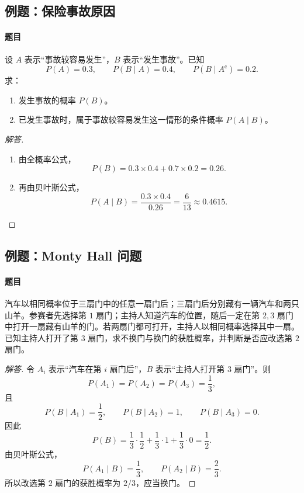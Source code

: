 \subsection{例题：保险事故原因}\label{note:c1:e19}
\paragraph{题目}
设 $A$ 表示“事故较容易发生”，$B$ 表示“发生事故”。已知
\[
P(A)=0.3,
\qquad
P(B\mid A)=0.4,
\qquad
P(B\mid A^{\mathrm c})=0.2.
\]
求：
\begin{enumerate}
\item 发生事故的概率 $P(B)$。
\item 已发生事故时，属于事故较容易发生这一情形的条件概率 $P(A\mid B)$。
\end{enumerate}

\begin{proof}[解答]
\begin{enumerate}
\item 由全概率公式，
\[
P(B)=0.3\times0.4+0.7\times0.2=0.26.
\]
\item 再由贝叶斯公式，
\[
P(A\mid B)
=\frac{0.3\times0.4}{0.26}
=\frac6{13}
\approx0.4615.
\]
\end{enumerate}
\end{proof}

\subsection{例题：Monty Hall 问题}\label{note:c1:e20}
\paragraph{题目}
汽车以相同概率位于三扇门中的任意一扇门后；三扇门后分别藏有一辆汽车和两只山羊。参赛者先选择第 $1$ 扇门；主持人知道汽车的位置，随后一定在第 $2,3$ 扇门中打开一扇藏有山羊的门。若两扇门都可打开，主持人以相同概率选择其中一扇。已知主持人打开了第 $3$ 扇门，求不换门与换门的获胜概率，并判断是否应改选第 $2$ 扇门。

\begin{proof}[解答]
令 $A_i$ 表示“汽车在第 $i$ 扇门后”，$B$ 表示“主持人打开第 $3$ 扇门”。则
\[
P(A_1)=P(A_2)=P(A_3)=\frac13,
\]
且
\[
P(B\mid A_1)=\frac12,
\qquad
P(B\mid A_2)=1,
\qquad
P(B\mid A_3)=0.
\]
因此
\[
P(B)=\frac13\cdot\frac12+\frac13\cdot1+\frac13\cdot0=\frac12.
\]
由贝叶斯公式，
\[
P(A_1\mid B)=\frac13,
\qquad
P(A_2\mid B)=\frac23.
\]
所以改选第 $2$ 扇门的获胜概率为 $2/3$，应当换门。
\end{proof}

